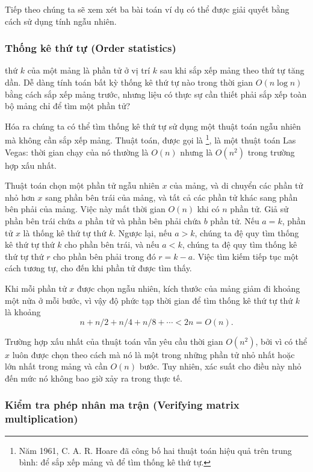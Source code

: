 Tiếp theo chúng ta sẽ xem xét ba bài toán ví dụ
có thể được giải quyết bằng cách sử dụng tính ngẫu nhiên.

\subsubsection{Thống kê thứ tự (Order statistics)}


 thứ $k$ của một mảng
là phần tử ở vị trí $k$ sau khi sắp xếp
mảng theo thứ tự tăng dần.
Dễ dàng tính toán bất kỳ thống kê thứ tự nào
trong thời gian $O(n \log n)$ bằng cách sắp xếp mảng trước,
nhưng liệu có thực sự cần thiết phải sắp xếp toàn bộ mảng
chỉ để tìm một phần tử?

Hóa ra chúng ta có thể tìm thống kê thứ tự
sử dụng một thuật toán ngẫu nhiên mà không cần sắp xếp mảng.
Thuật toán, được gọi là \footnote{Năm 1961,
C. A. R. Hoare đã công bố hai thuật toán
hiệu quả trên trung bình:  
 \cite{hoa61a} để sắp xếp mảng và
 \cite{hoa61b} để tìm thống kê thứ tự.}, là một thuật toán Las Vegas:
thời gian chạy của nó thường là $O(n)$
nhưng là $O(n^2)$ trong trường hợp xấu nhất.

Thuật toán chọn một phần tử ngẫu nhiên $x$
của mảng, và di chuyển các phần tử nhỏ hơn $x$
sang phần bên trái của mảng,
và tất cả các phần tử khác sang phần bên phải của mảng.
Việc này mất thời gian $O(n)$ khi có $n$ phần tử.
Giả sử phần bên trái chứa $a$ phần tử
và phần bên phải chứa $b$ phần tử.
Nếu $a=k$, phần tử $x$ là thống kê thứ tự thứ $k$.
Ngược lại, nếu $a>k$, chúng ta đệ quy tìm thống kê
thứ tự thứ $k$ cho phần bên trái,
và nếu $a<k$, chúng ta đệ quy tìm thống kê
thứ tự thứ $r$ cho phần bên phải trong đó $r=k-a$.
Việc tìm kiếm tiếp tục một cách tương tự, cho đến khi phần tử
được tìm thấy.

Khi mỗi phần tử $x$ được chọn ngẫu nhiên,
kích thước của mảng giảm đi khoảng một nửa ở mỗi bước,
vì vậy độ phức tạp thời gian để
tìm thống kê thứ tự thứ $k$ là khoảng
\[n+n/2+n/4+n/8+\cdots < 2n = O(n).\]

Trường hợp xấu nhất của thuật toán vẫn yêu cầu thời gian $O(n^2)$,
bởi vì có thể $x$ luôn được chọn
theo cách mà nó là một trong những phần tử nhỏ nhất hoặc lớn nhất
trong mảng và cần $O(n)$ bước.
Tuy nhiên, xác suất cho điều này nhỏ đến mức
nó không bao giờ xảy ra trong thực tế.

\subsubsection{Kiểm tra phép nhân ma trận (Verifying matrix multiplication)}

